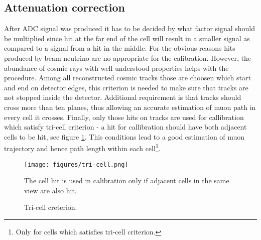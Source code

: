 \subsection{Attenuation correction}
After ADC signal was produced it has to be decided by what factor signal should be multiplied since hit at
the far end of the cell will result in a smaller signal as compared to a signal from a hit in the middle. 
For the obvious reasons hits produced by beam neutrino are no appropriate for the calibration. However,
the abundance of cosmic rays with well understood properties helps with the procedure. Among all reconstructed 
cosmic tracks those are choosen which start and end on detector edges, this criterion is needed to make sure
that tracks are not stopped inside the detector. Additional requirement is that tracks should cross more than
ten planes, thus allowing an accurate estimation of muon path in every cell it crosses. Finally, only those 
hits on tracks are used for callibration which satisfy tri-cell criterion - a hit for callibration should
have both adjacent cells to be hit, see figure \ref{fig:tri-cell}. This conditions lead to a good estimation 
of muon trajectory and hence path length within each cell\footnote{Only for cells which satisfies tri-cell 
criterion.}.
\begin{figure}[h]
\centering
\texttt{[image: figures/tri-cell.png]}
\caption{Tri-cell creterion.}
{The cell hit is used in calibration only if adjacent cells in the same view are also hit.}
\label{fig:tri-cell}
\end{figure}

